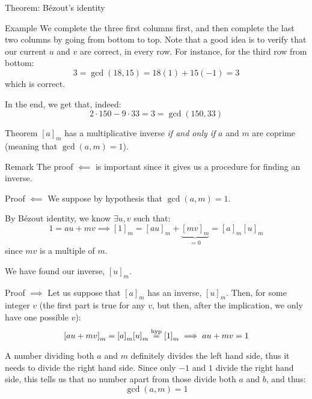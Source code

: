 \documentclass[a4paper]{article}
\begin{document}
\begin{parag}{Theorem: Bézout's identity}
\begin{subparag}{Example}
        We complete the three first columns first, and then complete the last two columns by going from bottom to top. Note that a good idea is to verify that our current $u$ and $v$ are correct, in every row. For instance, for the third row from bottom:
        \[3 = \gcd\left(18, 15\right) = 18\left(1\right) + 15\left(-1\right) = 3\]
        which is correct.

        In the end, we get that, indeed: 
        \[2\cdot 150 - 9\cdot 33 = 3 = \gcd\left(150, 33\right)\]
    \end{subparag}
\end{parag}

\begin{parag}{Theorem}
    $\left[a\right]_m$ has a multiplicative inverse \textit{if and only if} $a$ and $m$ are coprime (meaning that $\gcd\left(a, m\right) = 1$).

    \begin{subparag}{Remark}
        The proof $\impliedby$ is important since it gives us a procedure for finding an inverse.
    \end{subparag}
    

    \begin{subparag}{Proof $\impliedby$}
        We suppose by hypothesis that $\gcd\left(a, m\right) = 1$.

        By Bézout identity, we know $\exists u,v$ such that: 
        \[1 = au + mv \implies \left[1\right]_m = \left[au\right]_m + \underbrace{\left[mv\right]_m}_{= 0} = \left[a\right]_m \left[u\right]_m\]
        since $mv$ is a multiple of $m$.

        We have found our inverse, $\left[u\right]_m$.
    \end{subparag}

    \begin{subparag}{Proof $\implies$}
        Let us suppose that $\left[a\right]_m$ has an inverse, $\left[u\right]_m$. Then, for some integer $v$ (the first part is true for any $v$, but then, after the implication, we only have one possible $v$): 
        \[\left[au + mv\right]_m = \left[a\right]_m \left[u\right]_m \over{=}{hyp} \left[1\right]_m \implies au + mv = 1\]
        
        A number dividing both $a$ and $m$ definitely divides the left hand side, thus it needs to divide the right hand side. Since only $-1$ and $1$ divide the right hand side, this tells us that no number apart from those divide both $a$ and $b$, and thus: 
        \[\gcd\left(a, m\right) = 1\]
        

\end{subparag}
\end{parag}
\end{document}
